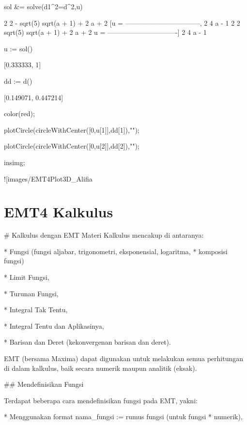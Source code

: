 \documentclass{article}
\begin{document}
\>sol &= solve(d1^2=d^2,u)


    
                                 2           2
                 - sqrt(5) sqrt(a  + 1) + 2 a  + 2
            [u = ---------------------------------, 
                                2
                             4 a  - 1
                                                        2           2
                                          sqrt(5) sqrt(a  + 1) + 2 a  + 2
                                      u = -------------------------------]
                                                        2
                                                     4 a  - 1
    

\>u := sol()


    [0.333333,  1]

\>dd := d()


    [0.149071,  0.447214]

\>color(red);

\>plotCircle(circleWithCenter([0,u[1]],dd[1]),"");

\>plotCircle(circleWithCenter([0,u[2]],dd[2]),"");

\>insimg;


![images/EMT4Plot3D_Alifia%

    
\section{EMT4 Kalkulus}
# Kalkulus dengan EMT
Materi Kalkulus mencakup di antaranya:


* 
Fungsi (fungsi aljabar, trigonometri, eksponensial, logaritma,
* komposisi fungsi)

* 
Limit Fungsi,

* 
Turunan Fungsi,

* 
Integral Tak Tentu,

* 
Integral Tentu dan Aplikasinya,

* 
Barisan dan Deret (kekonvergenan barisan dan deret).


EMT (bersama Maxima) dapat digunakan untuk melakukan semua perhitungan
di dalam kalkulus, baik secara numerik maupun analitik (eksak).


## Mendefinisikan Fungsi

Terdapat beberapa cara mendefinisikan fungsi pada EMT, yakni:


* 
Menggunakan format nama_fungsi := rumus fungsi (untuk fungsi
* numerik),
\end{document}
